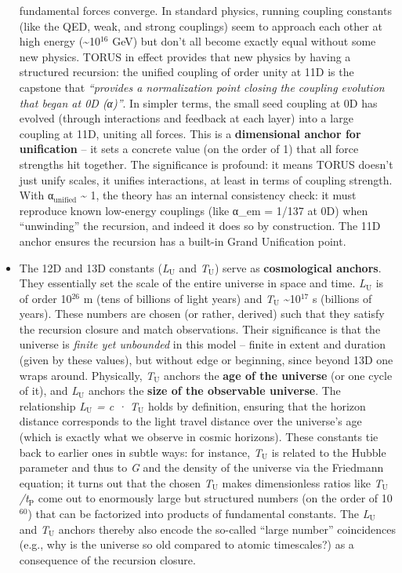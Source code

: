 \documentclass[]{article}
\newcommand{\subscript}[1]{\ensuremath{_{\mathrm{#1}}}}
\newcommand{\superscript}[1]{\ensuremath{^{\mathrm{#1}}}}
\begin{document}
\begin{itemize}
  fundamental forces converge. In standard physics, running coupling
  constants (like the QED, weak, and strong couplings) seem to approach
  each other at high energy (\textasciitilde{}10\superscript{16} GeV) but don't
  all become exactly equal without some new physics. TORUS in effect
  provides that new physics by having a structured recursion: the
  unified coupling of order unity at 11D is the capstone that
  \emph{``provides a normalization point closing the coupling evolution
  that began at 0D (α)''}​. In simpler terms, the small seed coupling at
  0D has evolved (through interactions and feedback at each layer) into
  a large coupling at 11D, uniting all forces. This is a
  \textbf{dimensional anchor for unification} -- it sets a concrete
  value (on the order of 1) that all force strengths hit together. The
  significance is profound: it means TORUS doesn't just unify scales, it
  unifies interactions, at least in terms of coupling strength. With
  α\subscript{unified}
  \textasciitilde{} 1, the theory has an internal consistency check: it
  must reproduce known low-energy couplings (like α\_em = 1/137 at 0D)
  when ``unwinding'' the recursion, and indeed it does so by
  construction. The 11D anchor ensures the recursion has a built-in
  Grand Unification point.
\item
  The 12D and 13D constants
  (\emph{L\subscript{U}}
  and
  \emph{T\subscript{U}})
  serve as \textbf{cosmological anchors}. They essentially set the scale
  of the entire universe in space and time.
  \emph{L\subscript{U}} is
  of order 10\superscript{26} m (tens of billions of light years) and
  \emph{T\subscript{U}}
  \textasciitilde{}10\superscript{17} s (billions of years). These numbers are
  chosen (or rather, derived) such that they satisfy the recursion
  closure and match observations. Their significance is that the
  universe is \emph{finite yet unbounded} in this model -- finite in
  extent and duration (given by these values), but without edge or
  beginning, since beyond 13D one wraps around. Physically,
  \emph{T\subscript{U}}
  anchors the \textbf{age of the universe} (or one cycle of it), and
  \emph{L\subscript{U}}
  anchors the \textbf{size of the observable universe}. The relationship
  \emph{L\subscript{U} = c
  · T\subscript{U}} holds
  by definition​, ensuring that the horizon distance corresponds to the
  light travel distance over the universe's age (which is exactly what
  we observe in cosmic horizons). These constants tie back to earlier
  ones in subtle ways: for instance,
  \emph{T\subscript{U}}
  is related to the Hubble parameter and thus to \emph{G} and the density
  of the universe via the Friedmann equation​; it turns out that the
  chosen
  \emph{T\subscript{U}}
  makes dimensionless ratios like
  \emph{T\subscript{U}/t\subscript{P}}
  come out to enormously large but structured numbers (on the order of
  10\superscript{60}) that can be factorized into products of fundamental
  constants. The
  \emph{L\subscript{U}}
  and
  \emph{T\subscript{U}}
  anchors thereby also encode the so-called ``large number''
  coincidences (e.g., why is the universe so old compared to atomic
  timescales?) as a consequence of the recursion closure.
\end{itemize}
\end{document}
